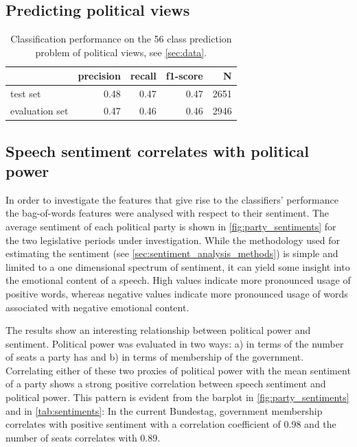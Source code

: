 \documentclass[runningheads,a4paper]{llncs}
\begin{document}
\subsection{Predicting political views}

\begin{table}[t]
\begin{center}
\begin{tabular}{lrrrr}
    &         precision    &recall &  f1-score  & N\\
\hline\hline
test set    &  0.48   &   0.47  &    0.47  &    2651\\
evaluation set    &  0.47    &  0.46 &     0.46 &     2946\\
%
\end{tabular}
\end{center}
\caption{
\label{tab:results_avg_political_view}
Classification performance on the 56 class prediction problem of political views, see \autoref{sec:data}.
}
\end{table}

\subsection{Speech sentiment correlates with political power}\label{sec:sentiment_result}
In order to investigate the features that give rise to the classifiers' performance the bag-of-words features were analysed with respect to their sentiment. The average sentiment of each political party is shown in \autoref{fig:party_sentiments} for the two legislative periods under investigation. While the methodology used for estimating the sentiment (see \autoref{sec:sentiment_analysis_methods}) is simple and limited to a one dimensional spectrum of sentiment, it can yield some insight into the emotional content of a speech. High values indicate more pronounced usage of positive words, whereas negative values indicate more pronounced usage of words associated with negative emotional content. 

The results show an interesting relationship between political power and sentiment. Political power was evaluated in two ways: a) in terms of the number of seats a party has and b) in terms of membership of the government. Correlating either of these two proxies of political power with the mean sentiment of a party shows a strong positive correlation between speech sentiment and political power. This pattern is evident from the barplot in \autoref{fig:party_sentiments} and in \autoref{tab:sentiments}: In the current Bundestag, government membership correlates with positive sentiment with a correlation coefficient of 0.98 and the number of seats correlates with 0.89. 
\end{document}
